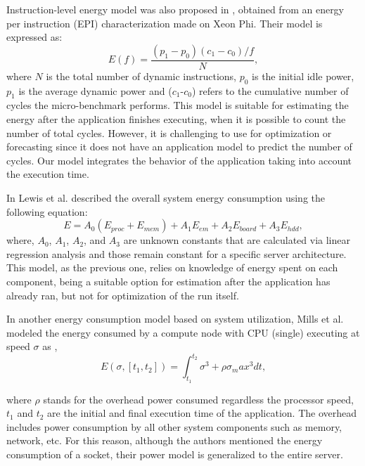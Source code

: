 \documentclass{ieeeaccess}
\begin{document}
Instruction-level energy model was also proposed in \cite{Characterization2013EnergyProcessor}, obtained from an energy per instruction (EPI) characterization made on Xeon Phi. Their model is expressed as:
\begin{equation}
    E(f) = \frac{(p_1 - p_0)(c_1 - c_0)/f}{N}, 
\end{equation}
where $N$ is the total number of dynamic instructions, $p_0$ is the initial idle power, $p_1$ is the average dynamic power and ($c_1$-$c_0$) refers to the cumulative number of cycles the micro-benchmark performs. This model is suitable for estimating the energy after the application finishes executing, when it is possible to count the number of total cycles. However, it is challenging to use for optimization or forecasting since it does not have an application model to predict the number of cycles. Our model integrates the behavior of the application taking into account the execution time.

In \cite{Lewis2008Run-timeSystems} Lewis et al. described the overall system energy consumption using the following equation:
\begin{equation}
E = A_0(E_{proc} + E_{mem}) + A_1E_{em} + A_2E_{board} + A_3E_{hdd},    
\end{equation}
where, $A_0$, $A_1$, $A_2$, and $A_3$ are unknown constants that are calculated via linear regression analysis and those remain constant for a specific server architecture. This model, as the previous one, relies on knowledge of energy spent on each component, being  a suitable option for estimation after the application has already ran, but not for optimization of the run itself.

In another energy consumption model  based on system utilization, Mills et al. modeled the energy consumed by a compute node with CPU (single) executing at speed $\sigma$ as \cite{Mills2014EnergySystems},
\begin{equation}
    E(\sigma,[t_1,t_2]) = \int_{t_1}^{t_2} \sigma^3 + \rho \sigma_max^3 dt,
\end{equation}

where $\rho$ stands for the overhead power  consumed regardless the processor speed, $t_1$ and $t_2$ are the initial and final execution time of the application. The overhead includes power consumption by all other system components such as memory, network, etc. For this reason, although the authors mentioned the energy consumption of a socket, their power model is generalized to the entire server.
\end{document}

